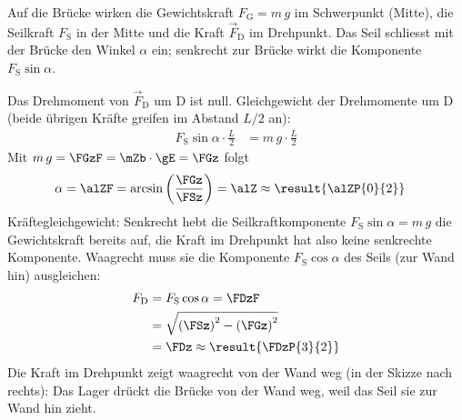 \begin{center}
\end{center}

Auf die Brücke wirken die Gewichtskraft $F_\mathrm{G} = m\,g$ im Schwerpunkt (Mitte), die Seilkraft $F_\mathrm{S}$ in der Mitte und die Kraft $\vec F_\mathrm{D}$ im Drehpunkt. Das Seil schliesst mit der Brücke den Winkel $\alpha$ ein; senkrecht zur Brücke wirkt die Komponente $F_\mathrm{S}\sin\alpha$.

Das Drehmoment von $\vec F_\mathrm{D}$ um D ist null. Gleichgewicht der Drehmomente um D (beide übrigen Kräfte greifen im Abstand $L/2$ an):
\begin{align}
 F_\mathrm{S}\sin\alpha\cdot\frac{L}{2} &= m\,g\cdot\frac{L}{2}
\end{align}
Mit $m\,g = \FGzF = \mZb\cdot\gE = \FGz$ folgt
\begin{align}
 \alpha &= \alZF = \arcsin\left(\frac{\FGz}{\FSz}\right) = \alZ \approx \result{\alZP{0}{2}}
\end{align}
Kräftegleichgewicht: Senkrecht hebt die Seilkraftkomponente $F_\mathrm{S}\sin\alpha = m\,g$ die Gewichtskraft bereits auf, die Kraft im Drehpunkt hat also keine senkrechte Komponente. Waagrecht muss sie die Komponente $F_\mathrm{S}\cos\alpha$ des Seils (zur Wand hin) ausgleichen:
\begin{align}
 F_\mathrm{D} &= F_\mathrm{S}\cos\alpha = \FDzF \\
   &= \sqrt{\left(\FSz\right)^2-\left(\FGz\right)^2} \\
   &= \FDz \approx \result{\FDzP{3}{2}}
\end{align}
Die Kraft im Drehpunkt zeigt waagrecht von der Wand weg (in der Skizze nach rechts): Das Lager drückt die Brücke von der Wand weg, weil das Seil sie zur Wand hin zieht.
